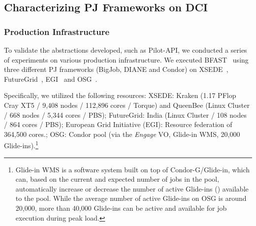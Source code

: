 \documentclass{sig-alternate}
\begin{document}
\subsection{Characterizing PJ Frameworks on DCI}
\label{sec:fg-xsede-osg-egi}


\subsubsection*{Production Infrastructure} 

To validate the abstractions developed,
such as Pilot-API, we conducted a series of
experiments on various production infrastructure. We executed
BFAST~\cite{bfast2009} using three different PJ frameworks (BigJob,
DIANE and Condor) on XSEDE~\cite{xsede}, FutureGrid~\cite{fg},
EGI~\cite{egi} and OSG~\cite{1742-6596-78-1-012057}.

Specifically, we utilized the following resources: XSEDE: Kraken (1.17
PFlop Cray XT5 / 9,408 nodes / 112,896 cores / Torque) and QueenBee
(Linux Cluster / 668 nodes / 5,344 cores / PBS); FutureGrid:
India (Linux Cluster / 108 nodes / 864 cores / PBS); European Grid
Initiative (EGI): Resource federation of 364,500 cores.;
OSG: Condor pool (via the \textit{Engage} VO, Glide-in WMS,
20,000 Glide-ins).\footnote{Glide-in WMS is a software system built on
top of Condor-G/Glide-in, which can, based on the current and expected
number of jobs in the pool,  automatically increase or decrease the
number of active Glide-ins (\pilots) available to the pool.  While the
average number of active Glide-ins on OSG is around 20,000, more than
40,000 Glide-ins can be active and available for job execution during
peak load.}

 
\end{document}
